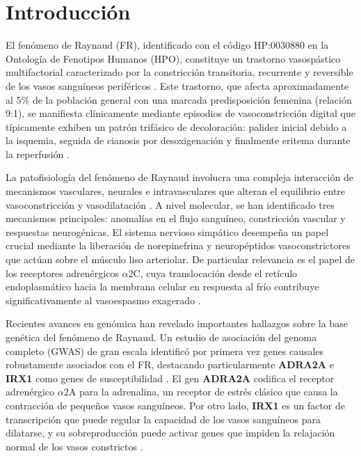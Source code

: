 \section{Introducción}

El fenómeno de Raynaud (FR), identificado con el código HP:0030880 en la Ontología de Fenotipos Humanos (HPO), constituye un trastorno vasospástico multifactorial caracterizado por la constricción transitoria, recurrente y reversible de los vasos sanguíneos periféricos \cite{Nawaz2022}. Este trastorno, que afecta aproximadamente al 5\% de la población general con una marcada predisposición femenina (relación 9:1), se manifiesta clínicamente mediante episodios de vasoconstricción digital que típicamente exhiben un patrón trifásico de decoloración: palidez inicial debido a la isquemia, seguida de cianosis por desoxigenación y finalmente eritema durante la reperfusión \cite{Medscape2024, Musa2023}.

La patofisiología del fenómeno de Raynaud involucra una compleja interacción de mecanismos vasculares, neurales e intravasculares que alteran el equilibrio entre vasoconstricción y vasodilatación \cite{Herrick2005}. A nivel molecular, se han identificado tres mecanismos principales: anomalías en el flujo sanguíneo, constricción vascular y respuestas neurogénicas. El sistema nervioso simpático desempeña un papel crucial mediante la liberación de norepinefrina y neuropéptidos vasoconstrictores que actúan sobre el músculo liso arteriolar. De particular relevancia es el papel de los receptores adrenérgicos $\alpha$2C, cuya translocación desde el retículo endoplasmático hacia la membrana celular en respuesta al frío contribuye significativamente al vasoespasmo exagerado \cite{Fardoun2016, Flavahan2008}.

Recientes avances en genómica han revelado importantes hallazgos sobre la base genética del fenómeno de Raynaud. Un estudio de asociación del genoma completo (GWAS) de gran escala identificó por primera vez genes causales robustamente asociados con el FR, destacando particularmente \textbf{ADRA2A} e \textbf{IRX1} como genes de susceptibilidad \cite{Hartmann2023}. El gen \textbf{ADRA2A} codifica el receptor adrenérgico $\alpha$2A para la adrenalina, un receptor de estrés clásico que causa la contracción de pequeños vasos sanguíneos. Por otro lado, \textbf{IRX1} es un factor de transcripción que puede regular la capacidad de los vasos sanguíneos para dilatarse, y su sobreproducción puede activar genes que impiden la relajación normal de los vasos constrictos \cite{ofLondon2023}.

